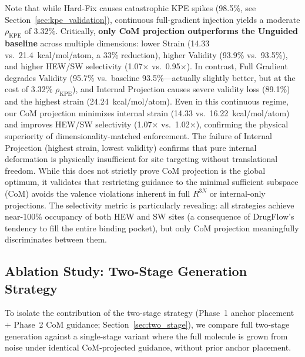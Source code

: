 \documentclass{article}
\begin{document}
Note that while Hard-Fix causes catastrophic KPE spikes (98.5\%, see
Section~\ref{sec:kpe_validation}), continuous full-gradient injection yields a
moderate $\rho_{\text{KPE}}$ of 3.32\%.  Critically, \textbf{only CoM
projection outperforms the Unguided baseline} across multiple dimensions:
lower Strain (14.33 vs.\ 21.4~kcal/mol/atom, a 33\% reduction), higher
Validity (93.9\% vs.\ 93.5\%), and higher HEW/SW selectivity (1.07$\times$
vs.\ 0.95$\times$).  In contrast, Full Gradient degrades Validity (95.7\%
vs.\ baseline 93.5\%—actually slightly better, but at the cost of 3.32\%
$\rho_{\text{KPE}}$), and Internal Projection causes severe validity loss
(89.1\%) and the highest strain (24.24~kcal/mol/atom).  Even in this
continuous regime, our CoM projection minimizes internal strain
(14.33 vs.\ 16.22~kcal/mol/atom) and improves HEW/SW selectivity
(1.07$\times$ vs.\ 1.02$\times$), confirming the physical superiority of
dimensionality-matched enforcement.  The failure of Internal Projection
(highest strain, lowest validity) confirms that pure internal deformation
is physically insufficient for site targeting without translational
freedom.  While this does not strictly prove CoM projection is the global
optimum, it validates that restricting guidance to the minimal sufficient
subspace (CoM) avoids the valence violations inherent in full $R^{3N}$ or
internal-only projections.  The selectivity metric is particularly
revealing: all strategies
achieve near-100\% occupancy of both HEW and SW sites (a consequence of
DrugFlow's tendency to fill the entire binding pocket), but only CoM
projection meaningfully discriminates between them.

\subsection{Ablation Study: Two-Stage Generation Strategy}
\label{sec:ablation_two_stage}

To isolate the contribution of the two-stage strategy (Phase~1 anchor placement
$+$ Phase~2 CoM guidance; Section~\ref{sec:two_stage}), we compare full
two-stage generation against a single-stage variant where the full molecule is
grown from noise under identical CoM-projected guidance, without prior anchor
placement.
\end{document}
